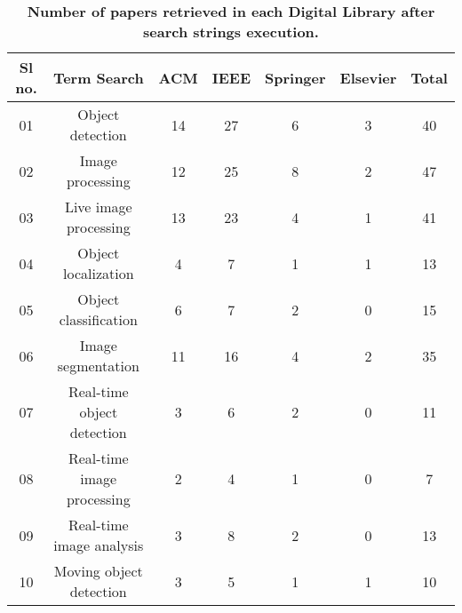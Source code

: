 \documentclass[two column]{ieeeaccess}
\begin{document}
    \begin{table*}[h]
\begin{center}
\caption{\textbf{Number of papers retrieved in each Digital Library after search strings execution.}}
\begin{tabular}{c|c|c|c|c|c|c}
\hline
        Sl no. &  Term Search & ACM & IEEE & Springer & Elsevier & Total     \\ 
\hline
        01 & Object detection & 14 & 27 & 6 & 3 & 40 \\
        02 & Image processing & 12 & 25 & 8 & 2 & 47 \\
        03 & Live image processing & 13 & 23 & 4 & 1 & 41 \\
        04 & Object localization & 4 & 7 & 1 & 1 & 13 \\
        05 & Object classification & 6 & 7 & 2 & 0 & 15 \\
        06 & Image segmentation & 11 & 16 & 4 & 2 & 35 \\
        07 & Real-time object detection & 3 & 6 & 2 & 0 & 11 \\
        08 & Real-time image processing & 2 & 4 & 1 & 0 & 7 \\
        09 & Real-time image analysis & 3 & 8 & 2 & 0 & 13 \\
        10 & Moving object detection & 3 & 5 & 1 & 1 & 10 \\
\hline
\end{tabular}
\end{center}
\end{table*}
\end{document}
